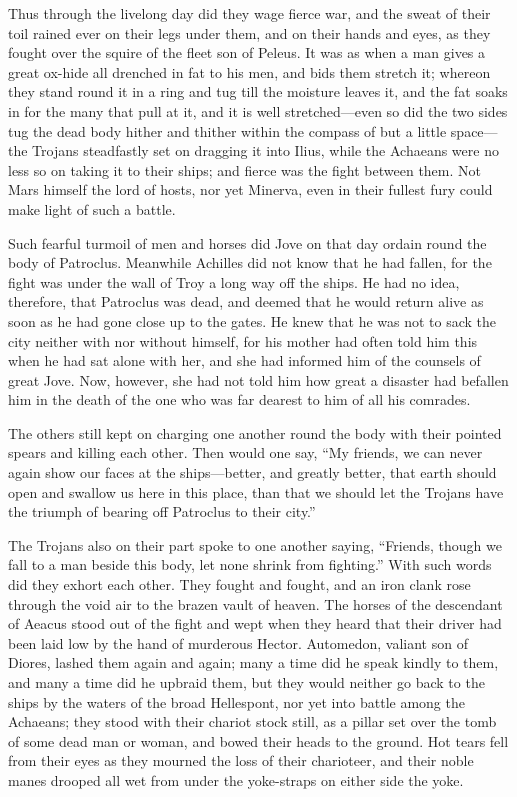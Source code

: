 Thus through the livelong day did they wage fierce war, and the sweat of
their toil rained ever on their legs under them, and on their hands and
eyes, as they fought over the squire of the fleet son of Peleus. It was as
when a man gives a great ox-hide all drenched in fat to his men, and bids
them stretch it; whereon they stand round it in a ring and tug till the
moisture leaves it, and the fat soaks in for the many that pull at it, and
it is well stretched—even so did the two sides tug the dead body
hither and thither within the compass of but a little space—the
Trojans steadfastly set on dragging it into Ilius, while the Achaeans were
no less so on taking it to their ships; and fierce was the fight between
them. Not Mars himself the lord of hosts, nor yet Minerva, even in their
fullest fury could make light of such a battle.

Such fearful turmoil of men and horses did Jove on that day ordain round
the body of Patroclus. Meanwhile Achilles did not know that he had fallen,
for the fight was under the wall of Troy a long way off the ships. He had
no idea, therefore, that Patroclus was dead, and deemed that he would
return alive as soon as he had gone close up to the gates. He knew that he
was not to sack the city neither with nor without himself, for his mother
had often told him this when he had sat alone with her, and she had
informed him of the counsels of great Jove. Now, however, she had not told
him how great a disaster had befallen him in the death of the one who was
far dearest to him of all his comrades.

The others still kept on charging one another round the body with their
pointed spears and killing each other. Then would one say, “My friends, we
can never again show our faces at the ships—better, and greatly
better, that earth should open and swallow us here in this place, than
that we should let the Trojans have the triumph of bearing off Patroclus
to their city.”

The Trojans also on their part spoke to one another saying, “Friends,
though we fall to a man beside this body, let none shrink from fighting.”
With such words did they exhort each other. They fought and fought, and an
iron clank rose through the void air to the brazen vault of heaven. The
horses of the descendant of Aeacus stood out of the fight and wept when
they heard that their driver had been laid low by the hand of murderous
Hector. Automedon, valiant son of Diores, lashed them again and again;
many a time did he speak kindly to them, and many a time did he upbraid
them, but they would neither go back to the ships by the waters of the
broad Hellespont, nor yet into battle among the Achaeans; they stood with
their chariot stock still, as a pillar set over the tomb of some dead man
or woman, and bowed their heads to the ground. Hot tears fell from their
eyes as they mourned the loss of their charioteer, and their noble manes
drooped all wet from under the yoke-straps on either side the yoke.

